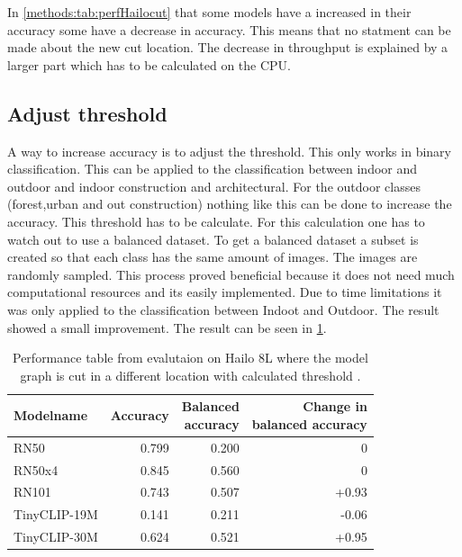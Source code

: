 In \cref{methods:tab:perfHailocut} that some models have a increased  in their accuracy some have a decrease in accuracy.
This means that no statment can be made about the new cut location.
The decrease in throughput is explained by a larger part which has to be calculated on the CPU.

\subsection{Adjust threshold}

A way to increase accuracy is to adjust the threshold.
This only works in binary classification.
This can be applied to the classification between indoor and outdoor and indoor construction and architectural.
For the outdoor classes (forest,urban and out construction) nothing like this can be done to increase the accuracy.
This threshold has to be calculate.
For this calculation one has to watch out to use a balanced dataset.
To get a balanced dataset a subset is created so that each class has the same amount of images.
The images are randomly sampled.
This process proved beneficial because it does not need much computational resources and its easily implemented.
Due to time limitations it was only applied to the classification between Indoot and Outdoor.
The result showed a small improvement.
The result can be seen in \cref{methods:tab:perfHailocutTh}.

\begin{table}[]
    \centering
    \begin{tabular}{l|rrr}
        \hline
        Modelname & Accuracy &  \makecell{Balanced \\accuracy}&  \makecell{Change in \\balanced accuracy}\\ \hline
        RN50 & 0.799 & 0.200  & 0\\ 
        RN50x4 & 0.845 & 0.560 & 0\\
        RN101 & 0.743& 0.507 & +0.93\\  
        TinyCLIP-19M & 0.141 & 0.211 & -0.06\\ 
        TinyCLIP-30M & 0.624 & 0.521 & +0.95\\ 
    \end{tabular}
    \caption{Performance table from evalutaion on Hailo 8L where the model graph is cut in a different location with calculated threshold .}
    \label{methods:tab:perfHailocutTh}
\end{table}


